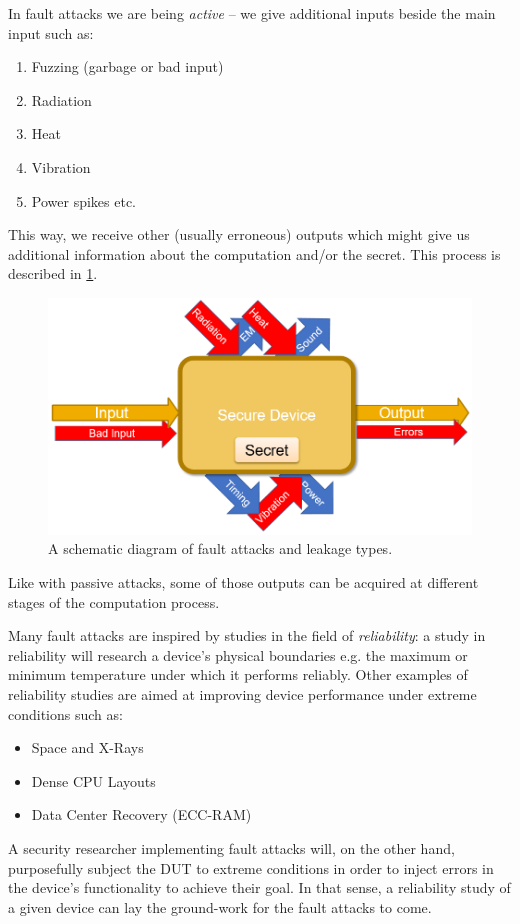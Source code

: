 In fault attacks we are being \emph{active} -- we give additional inputs beside the main input such as:
\begin{enumerate}
	\item Fuzzing (garbage or bad input)
	\item Radiation
	\item Heat
	\item Vibration
	\item Power spikes etc.
\end{enumerate}

This way, we receive other (usually erroneous) outputs which might give us additional information about the computation and/or the secret. This process is described in \cref{fig:fault_attacks_schematic}.

\begin{figure}[!ht]
	\centering
	\includegraphics[width=0.7\linewidth]{images/ch9/fault_attacks_schematic.png}
	\caption{A schematic diagram of fault attacks and leakage types.}
	\label{fig:fault_attacks_schematic}
\end{figure}

Like with passive attacks, some of those outputs can be acquired at different stages of the computation process.

Many fault attacks are inspired by studies in the field of \emph{reliability}: a study in reliability will research a device's physical boundaries e.g. the maximum or minimum temperature under which it performs reliably. Other examples of reliability studies are aimed at improving device performance under extreme conditions such as:
\begin{itemize}
	\item Space and X-Rays
	\item Dense CPU Layouts
	\item Data Center Recovery (ECC-RAM)
\end{itemize}

A security researcher implementing fault attacks will, on the other hand,  purposefully subject the DUT to extreme conditions in order to inject errors in the device's functionality to achieve their goal. In that sense, a reliability study of a given device can lay the ground-work for the fault attacks to come.

